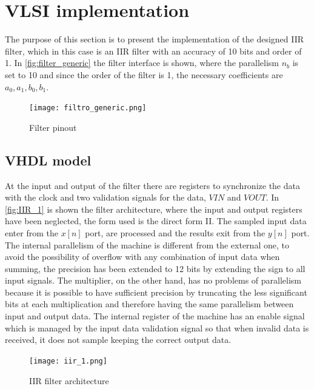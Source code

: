 \section{VLSI implementation}

The purpose of this section is to present the implementation of the designed IIR filter, which in this case is an IIR filter with an accuracy of 10 bits and order of 1. In \autoref{fig:filter_generic} the filter interface is shown, where the parallelism $n_b$ is set to 10 and since the order of the filter is 1, the necessary coefficients are $a_0, a_1, b_0, b_1$.

\begin{figure}[h]
	\center
	\texttt{[image: filtro\_generic.png]}
	\caption{Filter pinout}
	\label{fig:filtro_generic}
\end{figure}


\subsection{VHDL model}
At the input and output of the filter there are registers to synchronize the data with the clock and two validation signals for the data, $VIN$ and $VOUT$. In \autoref{fig:IIR_1} is shown the filter architecture, where the input and output registers have been neglected, the form used is the direct form II. The sampled input data enter from the $x[n]$ port, are processed and the results exit from the $y[n]$ port. The internal parallelism of the machine is different from the external one, to avoid the possibility of overflow with any combination of input data when summing, the precision has been extended to 12 bits by extending the sign to all input signals. The multiplier, on the other hand, has no problems of parallelism because it is possible to have sufficient precision by truncating the less significant bits at each multiplication and therefore having the same parallelism between input and output data. The internal register of the machine has an enable signal which is managed by the input data validation signal so that when invalid data is received, it does not sample keeping the correct output data.

\begin{figure}[h]
	\center
	\texttt{[image: iir\_1.png]}
	\caption{IIR filter architecture}
	\label{fig:IIR_1}
\end{figure}

